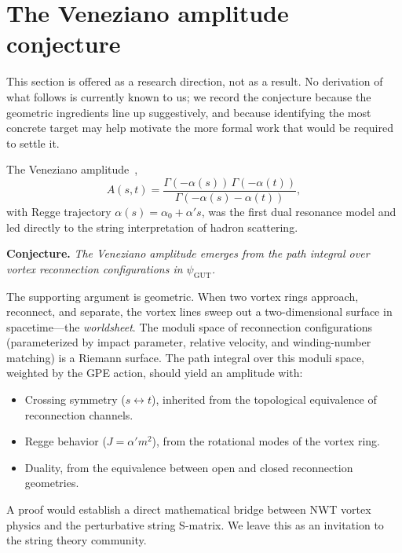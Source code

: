 \documentclass[11pt]{article}
\begin{document}
\section{The Veneziano amplitude conjecture}
\label{sec:veneziano}

This section is offered as a research direction, not as a result.
No derivation of what follows is currently known to us; we record the conjecture because the geometric ingredients line up suggestively, and because identifying the most concrete target may help motivate the more formal work that would be required to settle it.

The Veneziano amplitude~\cite{Veneziano1968},
\begin{equation}
A(s,t) = \frac{\Gamma(-\alpha(s))\,\Gamma(-\alpha(t))}{\Gamma(-\alpha(s)-\alpha(t))},
\end{equation}
with Regge trajectory $\alpha(s) = \alpha_0 + \alpha' s$, was the first dual resonance model and led directly to the string interpretation of hadron scattering.

\textbf{Conjecture.} \emph{The Veneziano amplitude emerges from the path integral over vortex reconnection configurations in $\psi_\text{GUT}$.}

The supporting argument is geometric.
When two vortex rings approach, reconnect, and separate, the vortex lines sweep out a two-dimensional surface in spacetime---the \emph{worldsheet}.
The moduli space of reconnection configurations (parameterized by impact parameter, relative velocity, and winding-number matching) is a Riemann surface.
The path integral over this moduli space, weighted by the GPE action, should yield an amplitude with:
\begin{itemize}
\item Crossing symmetry ($s \leftrightarrow t$), inherited from the topological equivalence of reconnection channels.
\item Regge behavior ($J = \alpha' m^2$), from the rotational modes of the vortex ring.
\item Duality, from the equivalence between open and closed reconnection geometries.
\end{itemize}

A proof would establish a direct mathematical bridge between NWT vortex physics and the perturbative string S-matrix.
We leave this as an invitation to the string theory community.
\end{document}
